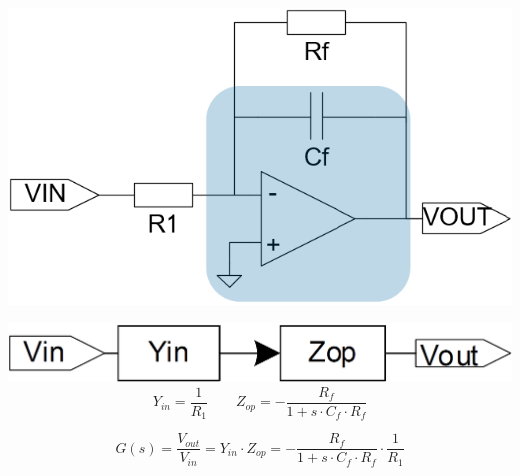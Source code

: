 \begin{minipage}[c]{0.4\columnwidth}
    \includegraphics[width=\columnwidth]{images/filter_signalflussdiagramme_tiefpass_ordnung_1.png}
\end{minipage}
\hfill
\begin{minipage}[c]{0.48\columnwidth}
    \includegraphics[width=\columnwidth]{images/filter_signalflussdiagramme_tiefpass_ordnung_1_sfd.png}
    $$ Y_{in} = \frac{1}{R_1} \qquad Z_{op} = - \frac{R_f}{1 + s \cdot C_f \cdot R_f} $$
\end{minipage}

$$ G(s)= \frac{V_{out}}{V_{in}} = Y_{in} \cdot Z_{op} =- \frac{R_f}{1 + s \cdot C_f \cdot R_f} \cdot \frac{1}{R_1} $$